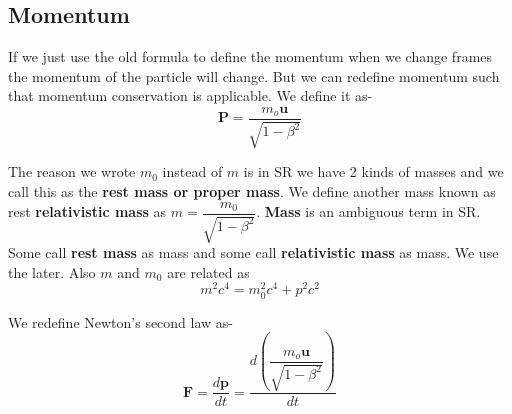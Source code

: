 \documentclass[12pt,a4paper]{article}
\numberwithin{table}{section}
\numberwithin{figure}{section}
\numberwithin{equation}{section}
\theoremstyle{remark}
\theoremstyle{definition}
\begin{document}
\subsection{Momentum}
If we just use the old formula to define the momentum when we change frames the momentum of the particle will change. But we can redefine momentum such that momentum conservation is applicable. We define it as-
\begin{equation}
\textbf{P}=\dfrac{m_o\textbf{u}}{\sqrt{1-\beta^2}} 
\end{equation}


The reason we wrote $m_0$ instead of $m$ is in SR we have 2 kinds of masses
and we call this as the \textbf{rest mass or proper mass}. We define another mass known as  rest \textbf{relativistic mass} as $m=\dfrac{m_0}{\sqrt{1-\beta^2}} $. \textbf{Mass} is an ambiguous term in SR. Some call \textbf{rest mass} as mass and some call \textbf{relativistic mass} as mass. We use the later. Also $m$ and $m_0$ are related as
\begin{equation}
   m^2c^4=m_0^2c^4+p^2c^2
\end{equation}

We redefine Newton's second law as-
\begin{equation}
\textbf{F}=\dfrac{d\textbf{p}}{dt}=\dfrac{d(\dfrac{m_o\textbf{u}}{\sqrt{1-\beta^2}})}{dt}
\end{equation}
\end{document}
